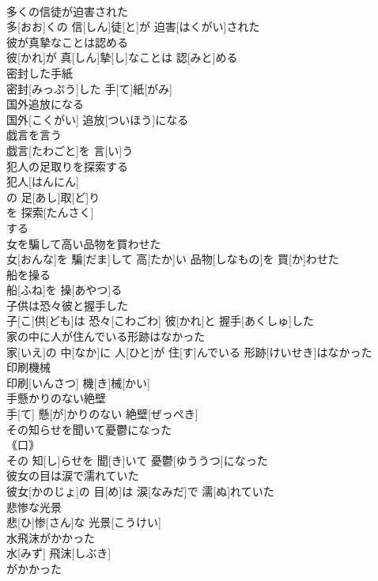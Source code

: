 \documentclass[8pt]{extreport}
\begin{document}
\begin{CJK}{UTF8}{min}
\\	多くの信徒が迫害された	
\\	多[おお]くの 信[しん]徒[と]が 迫害[はくがい]された
\\	彼が真摯なことは認める	
\\	彼[かれ]が 真[しん]摯[し]なことは 認[みと]める
\\	密封した手紙	
\\	密封[みっぷう]した 手[て]紙[がみ]
\\	国外追放になる	
\\	国外[こくがい] 追放[ついほう]になる
\\	戯言を言う	
\\	戯言[たわごと]を 言[い]う
\\	犯人の足取りを探索する	
\\	犯人[はんにん]
\\	の 足[あし]取[ど]り 
\\	を 探索[たんさく]
\\	する 
\\	女を騙して高い品物を買わせた	
\\	女[おんな]を 騙[だま]して 高[たか]い 品物[しなもの]を 買[か]わせた
\\	船を操る	
\\	船[ふね]を 操[あやつ]る
\\	子供は恐々彼と握手した	
\\	子[こ]供[ども]は 恐々[こわごわ] 彼[かれ]と 握手[あくしゅ]した
\\	家の中に人が住んでいる形跡はなかった	
\\	家[いえ]の 中[なか]に 人[ひと]が 住[す]んでいる 形跡[けいせき]はなかった
\\	印刷機械	
\\	印刷[いんさつ] 機[き]械[かい]
\\	手懸かりのない絶壁	
\\	手[て] 懸[が]かりのない 絶壁[ぜっぺき]
\\	その知らせを聞いて憂鬱になった	
\\	｟口｠ 
\\	その 知[し]らせを 聞[き]いて 憂鬱[ゆううつ]になった
\\	彼女の目は涙で濡れていた	
\\	彼女[かのじょ]の 目[め]は 涙[なみだ]で 濡[ぬ]れていた
\\	悲惨な光景	
\\	悲[ひ]惨[さん]な 光景[こうけい]
\\	水飛沫がかかった	
\\	水[みず] 飛沫[しぶき]
\\	がかかった 

\end{CJK}
\end{document}
